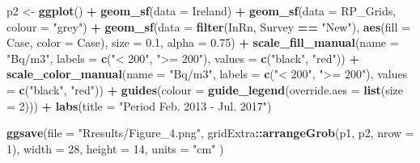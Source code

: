 \documentclass[
  12pt,
]{article}
\newenvironment{Shaded}{\begin{snugshade}}{\end{snugshade}}
\newcommand{\DataTypeTok}[1]{\textcolor[rgb]{0.13,0.29,0.53}{#1}}
\newcommand{\DecValTok}[1]{\textcolor[rgb]{0.00,0.00,0.81}{#1}}
\newcommand{\FloatTok}[1]{\textcolor[rgb]{0.00,0.00,0.81}{#1}}
\newcommand{\KeywordTok}[1]{\textcolor[rgb]{0.13,0.29,0.53}{\textbf{#1}}}
\newcommand{\NormalTok}[1]{#1}
\newcommand{\OperatorTok}[1]{\textcolor[rgb]{0.81,0.36,0.00}{\textbf{#1}}}
\newcommand{\StringTok}[1]{\textcolor[rgb]{0.31,0.60,0.02}{#1}}
\begin{document}
\begin{Shaded}
\begin{Highlighting}[]
\NormalTok{  p2 \textless{}{-}}\StringTok{ }\KeywordTok{ggplot}\NormalTok{() }\OperatorTok{+}
\StringTok{    }\KeywordTok{geom\_sf}\NormalTok{(}\DataTypeTok{data =}\NormalTok{ Ireland) }\OperatorTok{+}
\StringTok{    }\KeywordTok{geom\_sf}\NormalTok{(}\DataTypeTok{data =}\NormalTok{ RP\_Grids, }\DataTypeTok{colour =} \StringTok{"grey"}\NormalTok{) }\OperatorTok{+}
\StringTok{    }\KeywordTok{geom\_sf}\NormalTok{(}\DataTypeTok{data =} \KeywordTok{filter}\NormalTok{(InRn, Survey }\OperatorTok{==}\StringTok{ "New"}\NormalTok{),}
            \KeywordTok{aes}\NormalTok{(}\DataTypeTok{fill =}\NormalTok{ Case, }\DataTypeTok{color =}\NormalTok{ Case),}
            \DataTypeTok{size =} \FloatTok{0.1}\NormalTok{,}
            \DataTypeTok{alpha =} \FloatTok{0.75}\NormalTok{) }\OperatorTok{+}
\StringTok{    }\KeywordTok{scale\_fill\_manual}\NormalTok{(}\DataTypeTok{name =} \StringTok{"Bq/m3"}\NormalTok{,}
                      \DataTypeTok{labels =} \KeywordTok{c}\NormalTok{(}\StringTok{"\textless{} 200"}\NormalTok{,}
                                 \StringTok{"\textgreater{}= 200"}\NormalTok{),}
                      \DataTypeTok{values =} \KeywordTok{c}\NormalTok{(}\StringTok{"black"}\NormalTok{,}
                                 \StringTok{"red"}\NormalTok{)) }\OperatorTok{+}
\StringTok{    }\KeywordTok{scale\_color\_manual}\NormalTok{(}\DataTypeTok{name =} \StringTok{"Bq/m3"}\NormalTok{,}
                       \DataTypeTok{labels =} \KeywordTok{c}\NormalTok{(}\StringTok{"\textless{} 200"}\NormalTok{,}
                                  \StringTok{"\textgreater{}= 200"}\NormalTok{),}
                       \DataTypeTok{values =} \KeywordTok{c}\NormalTok{(}\StringTok{"black"}\NormalTok{,}
                                  \StringTok{"red"}\NormalTok{)) }\OperatorTok{+}
\StringTok{    }\KeywordTok{guides}\NormalTok{(}\DataTypeTok{colour =} \KeywordTok{guide\_legend}\NormalTok{(}\DataTypeTok{override.aes =} \KeywordTok{list}\NormalTok{(}\DataTypeTok{size =} \DecValTok{2}\NormalTok{))) }\OperatorTok{+}
\StringTok{    }\KeywordTok{labs}\NormalTok{(}\DataTypeTok{title =} \StringTok{"Period Feb. 2013 {-} Jul. 2017"}\NormalTok{)  }

  \KeywordTok{ggsave}\NormalTok{(}\DataTypeTok{file =} \StringTok{"Rresults/Figure\_4.png"}\NormalTok{,}
\NormalTok{         gridExtra}\OperatorTok{::}\KeywordTok{arrangeGrob}\NormalTok{(p1, p2, }\DataTypeTok{nrow =} \DecValTok{1}\NormalTok{),}
         \DataTypeTok{width =} \DecValTok{28}\NormalTok{,}
         \DataTypeTok{height =} \DecValTok{14}\NormalTok{,}
         \DataTypeTok{units =} \StringTok{"cm"}\NormalTok{ )}
\end{Highlighting}
\end{Shaded}
\end{document}
